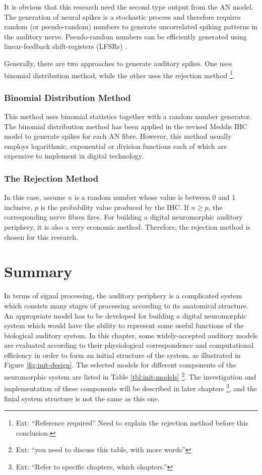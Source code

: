 \documentclass[11pt]{article}
\begin{document}
It is obvious that this research need the second type output from the
AN model. The generation of neural spikes is a stochastic process and
therefore requires random (or pseudo-random) numbers to generate
uncorrelated spiking patterns in the auditory nerve. Pseudo-random
numbers can be efficiently generated using linear-feedback
shift-registers (LFSRs) \cite{George2007}.

Generally, there are two approaches to generate auditory spikes. One
uses binomial distribution method, while the other uses the rejection
method \footnote{Ext: ``Reference required'' Need to explain the rejection method
  before this conclusion. }.
\subsubsection{Binomial Distribution Method}
\label{sec-3-5-1}
\label{sec:ch2-binomial-distribution-method}

This method uses binomial statistics together with a random number
generator. The binomial distribution method has been applied in the
revised Meddis IHC model to generate spikes for each AN fibre.
However, this method usually employs logarithmic, exponential or
division functions each of which are expensive to implement in digital
technology.
\subsubsection{The Rejection Method}
\label{sec-3-5-2}
\label{sec:ch2-the-rejection-method}

In this case, assume $n$ is a random number whose value is between 0 and 1
inclusive, $p$ is the probability value produced by the IHC. If $n\ge
p$, the corresponding nerve fibres fires. For building a digital
neuromorphic auditory periphery, it is also a very economic method.
Therefore, the rejection method is chosen for this research.
\section{Summary}
\label{sec-4}
\label{sec:ch2-summary}

In terms of signal processing, the auditory periphery is a complicated
system which consists many stages of processing according to its
anatomical structure. An appropriate model has to be developed for
building a digital neuromorphic system which would have the ability to
represent some useful functions of the biological auditory system.
In this chapter, some widely-accepted auditory models are evaluated
according to their physiological correspondence and computational
efficiency in order to form an initial structure of the system, as
illustrated in Figure \ref{fig:init-design}. The selected models for
different components of the neuromorphic system are listed in
Table \ref{tbl:init-models} \footnote{Ext: ``you need to discuss this table, with more words'' }. The investigation and implementation of
these components will be described in later chapters \footnote{Ext: ``Refer to specific chapters, which chapters.'' }, and the finial
system structure is not the same as this one.
\end{document}
